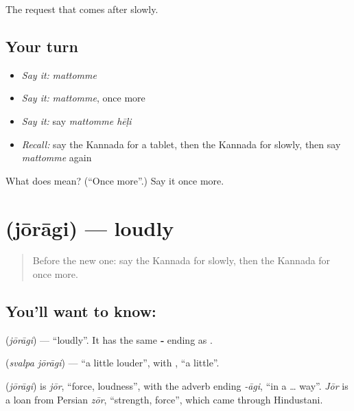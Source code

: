 \begin{grammarlens}[title={What you've built}]
The request that comes after slowly.
\end{grammarlens}

\subsection*{Your turn}
\begin{itemize}
\raggedright
  \item \emph{Say it:} \emph{mattomme}
  \item \emph{Say it:} \emph{mattomme}, once more
  \item \emph{Say it:} say \emph{mattomme hēḷi}
  \item \emph{Recall:} say the Kannada for a tablet, then the Kannada for slowly, then say \emph{mattomme} again
\end{itemize}

\begin{tcolorbox}[breakable,colback=teal!4,colframe=teal!35!black,title={Before you move on}]
What does  mean? (\textquotedblleft{}Once more\textquotedblright{}.) Say it once more.
\end{tcolorbox}
\section[\texorpdfstring{\kn{ಜೋರಾಗಿ} (jōrāgi)}{ಜೋರಾಗಿ (jōrāgi)}]{ (jōrāgi) — loudly}

\label{lesson:KA-C85-loudly}



\begin{quote}
Before the new one: say the Kannada for slowly, then the Kannada for once more.
\end{quote}

\subsection*{You'll want to know: }
\textbf{} (\emph{jōrāgi}) — \textquotedblleft{}loudly\textquotedblright{}. It has the same \textbf{‑} ending as \textbf{}.

\textbf{ } (\emph{svalpa jōrāgi}) — \textquotedblleft{}a little louder\textquotedblright{}, with \textbf{}, \textquotedblleft{}a little\textquotedblright{}.

\begin{cousinweb}
\textbf{} (\emph{jōrāgi}) is \emph{jōr}, \textquotedblleft{}force, loudness\textquotedblright{}, with the adverb ending \emph{-āgi}, \textquotedblleft{}in a … way\textquotedblright{}. \emph{Jōr} is a loan from Persian \emph{zōr}, \textquotedblleft{}strength, force\textquotedblright{}, which came through Hindustani.
\end{cousinweb}

